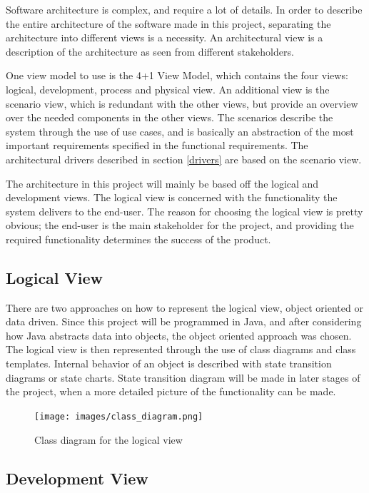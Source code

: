 Software architecture is complex, and require a lot of details. In order to  describe the entire architecture of the software made in this project, separating the architecture into different views is a necessity. An architectural view is a description of the architecture as seen from different stakeholders. 

 One view model to use is the 4+1 View Model, which contains the four views: logical, development, process and physical view. An additional view is the scenario view, which is redundant with the other views, but provide an overview over the needed components in the other views. The scenarios describe the system through the use of use cases, and is basically an abstraction of the most important requirements specified in the functional requirements.  The architectural drivers described in section \ref{drivers} are based on the scenario view.
 
 The architecture in this project will mainly be based off the logical and development views. The logical view is concerned with the functionality the system delivers to the end-user. The reason for choosing the logical view is pretty obvious; the end-user is the main stakeholder for the project, and providing the required functionality determines the success of the product. 
 
 \subsection{Logical View}

There are two approaches on how to represent the logical view, object oriented or data driven. Since this project will be programmed in Java, and after considering how Java abstracts data into objects, the object oriented approach was chosen. The logical view is then represented through the use of class diagrams and class templates.  Internal behavior of an object is described with state transition diagrams or state charts. State transition diagram will be made in later stages of the project, when a more detailed picture of the functionality can be made. \cite{4plus1view}

\begin{figure}[h]
	\center
	\texttt{[image: images/class\_diagram.png]}
	\caption{Class diagram for the logical view}
\end{figure}
\subsection{Development View}

